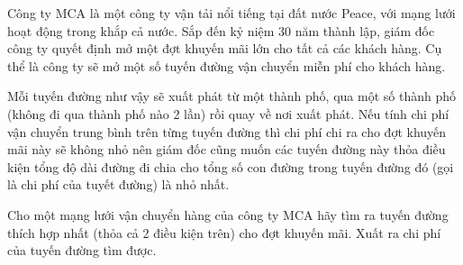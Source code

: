 Công ty MCA là một công ty vận tải nổi tiếng tại đất nước Peace, với mạng lưới hoạt động trong khắp cả nước. Sắp đến kỷ niệm 30 năm thành lập, giám đốc công ty quyết định mở một đợt khuyến mãi lớn cho tất cả các khách hàng. Cụ thể là công ty sẽ mở một số tuyến đường vận chuyển miễn phí cho khách hàng.  

   Mỗi tuyến đường như vậy sẽ xuất phát từ một thành phố, qua một số thành phố (không đi qua thành phố nào 2 lần) rồi quay về nơi xuất phát. Nếu tính chi phí vận chuyển trung bình trên từng tuyến đường thì chi phí chi ra cho đợt khuyến mãi này sẽ không nhỏ nên giám đốc cũng muốn các tuyến đường này thỏa điều kiện tổng độ dài đường đi chia cho tổng số con đường trong tuyến đường đó (gọi là chi phí của tuyết đường) là nhỏ nhất.  

   Cho một mạng lưới vận chuyển hàng của công ty MCA hãy tìm ra tuyến đường thích hợp nhất (thỏa cả 2 điều kiện trên) cho đợt khuyến mãi. Xuất ra chi phí của tuyến đường tìm được.